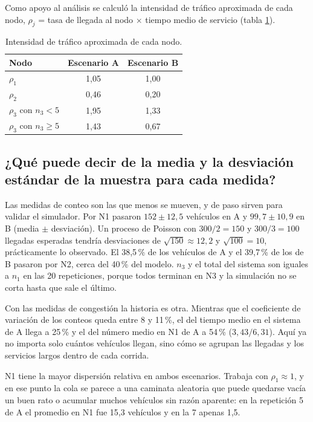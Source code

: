 \documentclass[11pt,letterpaper]{article}
\begin{document}
Como apoyo al análisis se calculó la intensidad de tráfico aproximada de cada nodo, $\rho_j$ = tasa de llegada
al nodo $\times$ tiempo medio de servicio (tabla \ref{tab:52rho}).

\begin{table}[H]
\centering
\caption{Intensidad de tráfico aproximada de cada nodo.}
\label{tab:52rho}
\small
\begin{tabular}{@{}lcc@{}}
\toprule
Nodo & Escenario A & Escenario B \\
\midrule
$\rho_1$ & 1,05 & 1,00 \\
$\rho_2$ & 0,46 & 0,20 \\
$\rho_3$ con $n_3 < 5$ & 1,95 & 1,33 \\
$\rho_3$ con $n_3 \ge 5$ & 1,43 & 0,67 \\
\bottomrule
\end{tabular}
\end{table}

\subsection{¿Qué puede decir de la media y la desviación estándar de la muestra para cada medida?}

Las medidas de conteo son las que menos se mueven, y de paso sirven para validar el simulador. Por N1 pasaron
$152 \pm 12{,}5$ vehículos en A y $99{,}7 \pm 10{,}9$ en B (media $\pm$ desviación). Un proceso de Poisson con
$300/2 = 150$ y $300/3 = 100$ llegadas esperadas tendría desviaciones de $\sqrt{150} \approx 12{,}2$ y
$\sqrt{100} = 10$, prácticamente lo observado. El 38,5\,\% de los vehículos de A y el 39,7\,\% de los de B pasaron
por N2, cerca del 40\,\% del modelo. $n_3$ y el total del sistema son iguales a $n_1$ en las 20 repeticiones,
porque todos terminan en N3 y la simulación no se corta hasta que sale el último.

Con las medidas de congestión la historia es otra. Mientras que el coeficiente de variación de los conteos queda
entre 8 y 11\,\%, el del tiempo medio en el sistema de A llega a 25\,\% y el del número medio en N1 de A a 54\,\%
($3{,}43/6{,}31$). Aquí ya no importa solo cuántos vehículos llegan, sino cómo se agrupan las llegadas y los
servicios largos dentro de cada corrida.

N1 tiene la mayor dispersión relativa en ambos escenarios. Trabaja con $\rho_1 \approx 1$, y en ese punto la cola
se parece a una caminata aleatoria que puede quedarse vacía un buen rato o acumular muchos vehículos sin
razón aparente: en la repetición 5 de A el promedio en N1 fue 15,3 vehículos y en la 7 apenas 1,5.
\end{document}
